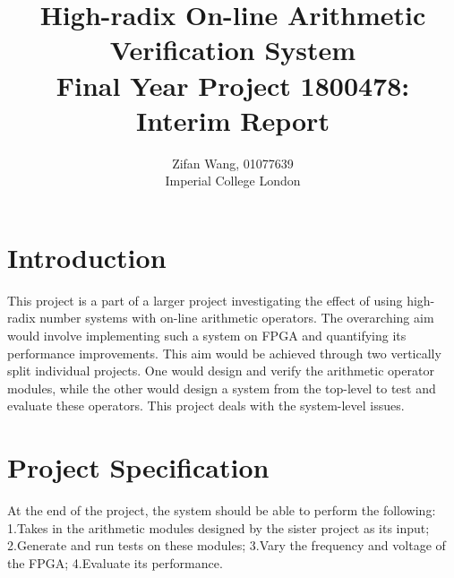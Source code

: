 \documentclass[journal]{IEEEtran}
\begin{document}
\title{%
  High-radix On-line Arithmetic Verification System\\
  \large Final Year Project 1800478: Interim Report}
\author{Zifan Wang, 01077639\\Imperial College London}


\maketitle


\section{Introduction}

This project is a part of a larger project investigating the effect of using
high-radix number systems with on-line arithmetic operators.
The overarching aim would involve implementing such a system on FPGA and
quantifying its performance improvements.
This aim would be achieved through two vertically split individual projects.
One would design and verify the arithmetic operator modules,
while the other would design a system from the top-level to test and
evaluate these operators.
This project deals with the system-level issues.


\section{Project Specification}

At the end of the project, the system should be able to perform the following:
1.Takes in the arithmetic modules designed by the sister project as its input;
2.Generate and run tests on these modules;
3.Vary the frequency and voltage of the FPGA;
4.Evaluate its performance.
\end{document}
